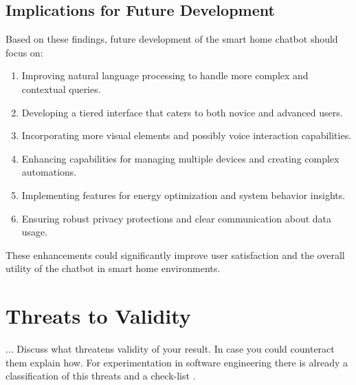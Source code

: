 \subsection{Implications for Future Development}
Based on these findings, future development of the smart home chatbot should focus on:
\begin{enumerate}
    \item Improving natural language processing to handle more complex and contextual queries.
    \item Developing a tiered interface that caters to both novice and advanced users.
    \item Incorporating more visual elements and possibly voice interaction capabilities.
    \item Enhancing capabilities for managing multiple devices and creating complex automations.
    \item Implementing features for energy optimization and system behavior insights.
    \item Ensuring robust privacy protections and clear communication about data usage.
\end{enumerate}


These enhancements could significantly improve user satisfaction and the overall utility of the chatbot in smart home environments.


\section{Threats to Validity}
... Discuss what threatens validity of your result. In case you could counteract them explain how. For experimentation in software engineering there is already a classification of this threats and a check-list \cite{DBLP:journals/ese/RunesonH09}.   

